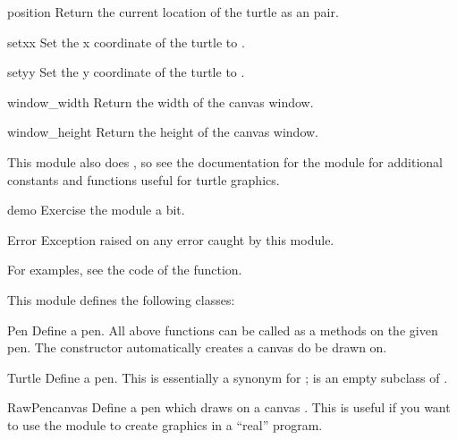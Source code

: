 \begin{funcdesc}{position}{}
Return the current location of the turtle as an  pair.
\end{funcdesc}

\begin{funcdesc}{setx}{x}
Set the x coordinate of the turtle to .
\end{funcdesc}

\begin{funcdesc}{sety}{y}
Set the y coordinate of the turtle to .
\end{funcdesc}

\begin{funcdesc}{window\_width}{}
Return the width of the canvas window.
\end{funcdesc}

\begin{funcdesc}{window\_height}{}
Return the height of the canvas window.
\end{funcdesc}

This module also does , so see the
documentation for the  module for additional constants
and functions useful for turtle graphics.

\begin{funcdesc}{demo}{}
Exercise the module a bit.
\end{funcdesc}

\begin{excdesc}{Error}
Exception raised on any error caught by this module.
\end{excdesc}

For examples, see the code of the  function.

This module defines the following classes:

\begin{classdesc}{Pen}{}
Define a pen. All above functions can be called as a methods on the given
pen. The constructor automatically creates a canvas do be drawn on.
\end{classdesc}

\begin{classdesc}{Turtle}{}
Define a pen. This is essentially a synonym for ;
 is an empty subclass of .
\end{classdesc}

\begin{classdesc}{RawPen}{canvas}
Define a pen which draws on a canvas . This is useful if 
you want to use the module to create graphics in a ``real'' program.
\end{classdesc}

